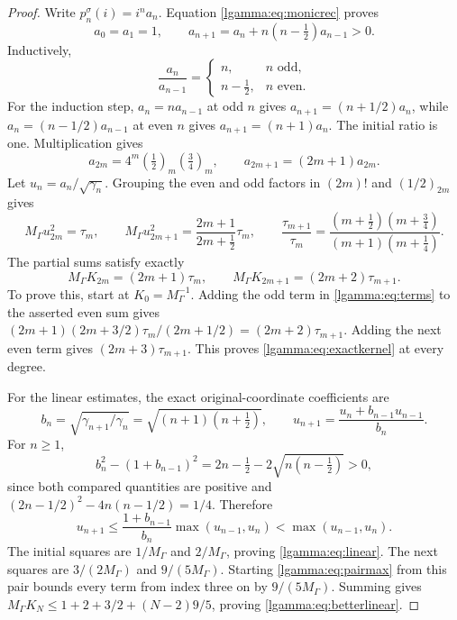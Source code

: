 \begin{proof}
Write $p_n^\sigma(i)=i^na_n$.  Equation \eqref{lgamma:eq:monicrec} proves
\[
 a_0=a_1=1,\qquad
 a_{n+1}=a_n+n(n-\tfrac12)a_{n-1}>0.
\]
Inductively,
\begin{equation}\label{lgamma:eq:alternating}
 \frac{a_n}{a_{n-1}}=
 \begin{cases}n,&n\text{ odd},\\n-\tfrac12,&n\text{ even}.
 \end{cases}
\end{equation}
For the induction step, $a_n=na_{n-1}$ at odd $n$ gives
$a_{n+1}=(n+1/2)a_n$, while $a_n=(n-1/2)a_{n-1}$ at even $n$
gives $a_{n+1}=(n+1)a_n$.  The initial ratio is one.  Multiplication gives
\[
 a_{2m}=4^m(\tfrac12)_m(\tfrac34)_m,
 \qquad a_{2m+1}=(2m+1)a_{2m}.
\]
Let $u_n=a_n/\sqrt{\gamma_n}$.  Grouping the even and odd factors
in $(2m)!$ and $(1/2)_{2m}$ gives
\begin{equation}\label{lgamma:eq:terms}
 M_\Gamma u_{2m}^2=\tau_m,\qquad
 M_\Gamma u_{2m+1}^2=\frac{2m+1}{2m+\tfrac12}\tau_m,
 \qquad
 \frac{\tau_{m+1}}{\tau_m}
 =\frac{(m+\tfrac12)(m+\tfrac34)}{(m+1)(m+\tfrac14)}.
\end{equation}
The partial sums satisfy exactly
\[
 M_\Gamma K_{2m}=(2m+1)\tau_m,
 \qquad M_\Gamma K_{2m+1}=(2m+2)\tau_{m+1}.
\]
To prove this, start at $K_0=M_\Gamma^{-1}$.  Adding the odd term
in \eqref{lgamma:eq:terms} to the asserted even sum gives
$(2m+1)(2m+3/2)\tau_m/(2m+1/2)=(2m+2)\tau_{m+1}$.
Adding the next even term gives $(2m+3)\tau_{m+1}$.  This proves
\eqref{lgamma:eq:exactkernel} at every degree.

For the linear estimates, the exact original-coordinate coefficients are
\[
 b_n=\sqrt{\gamma_{n+1}/\gamma_n}=\sqrt{(n+1)(n+\tfrac12)},
 \qquad u_{n+1}=\frac{u_n+b_{n-1}u_{n-1}}{b_n}.
\]
For $n\ge1$,
\[
 b_n^2-(1+b_{n-1})^2
 =2n-\tfrac12-2\sqrt{n(n-\tfrac12)}>0,
\]
since both compared quantities are positive and
$(2n-1/2)^2-4n(n-1/2)=1/4$.  Therefore
\begin{equation}\label{lgamma:eq:pairmax}
 u_{n+1}\le\frac{1+b_{n-1}}{b_n}\max(u_{n-1},u_n)
 <\max(u_{n-1},u_n).
\end{equation}
The initial squares are $1/M_\Gamma$ and $2/M_\Gamma$, proving
\eqref{lgamma:eq:linear}.  The next squares are $3/(2M_\Gamma)$ and
$9/(5M_\Gamma)$.  Starting \eqref{lgamma:eq:pairmax} from this pair bounds
every term from index three on by $9/(5M_\Gamma)$.  Summing gives
$M_\Gamma K_N\le1+2+3/2+(N-2)9/5$, proving
\eqref{lgamma:eq:betterlinear}.
\end{proof}

